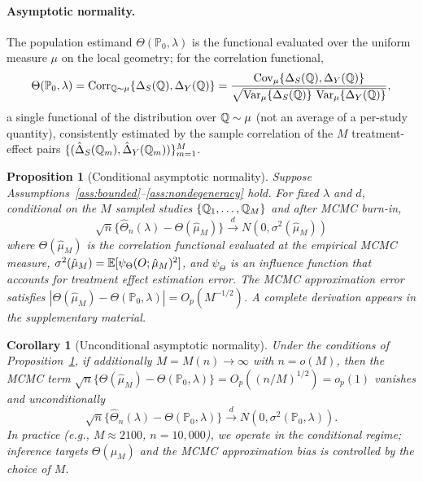 \documentclass{article}
\newtheorem{proposition}{Proposition}
\newtheorem{corollary}{Corollary}
\newcommand{\PP}{\mathbb{P}}
\begin{document}
\paragraph{Asymptotic normality.}
The population estimand $\Theta(\PP_0, \lambda)$ is the functional evaluated over the
uniform measure $\mu$ on the local geometry; for the correlation functional,
\[
    \Theta(\PP_0, \lambda) = \Corr_{\Q \sim \mu}\{\Delta_S(\Q), \Delta_Y(\Q)\}
    = \frac{\Cov_\mu\{\Delta_S(\Q), \Delta_Y(\Q)\}}{\sqrt{\Var_\mu\{\Delta_S(\Q)\}\,\Var_\mu\{\Delta_Y(\Q)\}}},
\]
a single functional of the distribution over $\mathbb{Q} \sim \mu$ (not an average of a
per-study quantity), consistently estimated by the sample correlation of the $M$
treatment-effect pairs $\{(\hat\Delta_S(\mathbb{Q}_m), \hat\Delta_Y(\mathbb{Q}_m))\}_{m=1}^M$.

\begin{proposition}[Conditional asymptotic normality]\label{prop:asymptotic}
Suppose Assumptions~\ref{ass:bounded}--\ref{ass:nondegeneracy} hold. For fixed $\lambda$ and $d$,
conditional on the $M$ sampled studies $\{\mathbb{Q}_1,\ldots,\mathbb{Q}_M\}$ and after MCMC burn-in,
\[
    \sqrt{n}\{\hat{\Theta}_n(\lambda) - \Theta(\hat{\mu}_M)\}
    \xrightarrow{d} N(0, \sigma^2(\hat{\mu}_M))
\]
where $\Theta(\hat{\mu}_M)$ is the correlation functional evaluated at the empirical MCMC measure,
$\sigma^2(\hat{\mu}_M) = \mathbb{E}[\psi_\Theta(O;\hat{\mu}_M)^2]$, and
$\psi_\Theta$ is an influence function that accounts for treatment effect estimation error.
The MCMC approximation error satisfies $|\Theta(\hat{\mu}_M) - \Theta(\PP_0,\lambda)| = O_p(M^{-1/2})$.
A complete derivation appears in the supplementary material.
\end{proposition}

\begin{corollary}[Unconditional asymptotic normality]\label{cor:asymptotic-unconditional}
Under the conditions of Proposition~\ref{prop:asymptotic}, if additionally $M = M(n) \to \infty$
with $n = o(M)$, then the MCMC term $\sqrt{n}\{\Theta(\hat{\mu}_M) - \Theta(\PP_0,\lambda)\} = O_p((n/M)^{1/2}) = o_p(1)$
vanishes and unconditionally
\[
    \sqrt{n}\{\hat{\Theta}_n(\lambda) - \Theta(\PP_0,\lambda)\}
    \xrightarrow{d} N(0, \sigma^2(\PP_0,\lambda)).
\]
In practice (e.g., $M \approx 2100$, $n = 10{,}000$), we operate in the conditional regime;
inference targets $\Theta(\hat{\mu}_M)$ and the MCMC approximation bias is controlled by the
choice of $M$.
\end{corollary}
\end{document}

